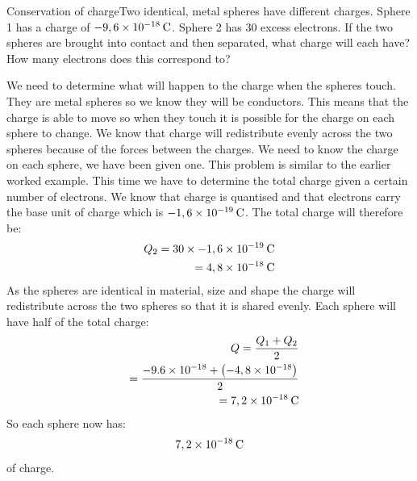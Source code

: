       \begin{wex}{Conservation of charge}{Two identical, metal spheres have different charges. Sphere 1 has a charge of $-9,6\ensuremath{\times}{10}^{-18}\phantom{\rule{2pt}{0ex}}\text{C}$. Sphere 2 has 30 excess electrons. If the two spheres are brought into contact and then separated, what charge will each have? How many electrons does this correspond to?}{
     We need to determine what will happen to the charge when the spheres touch. They are metal spheres so we know they will be conductors. This means that the charge is able to move so when they touch it is possible for the charge on each sphere to change. We know that charge will redistribute evenly across the two spheres because of the forces between the charges. We need to know the charge on each sphere, we have been given one.
     This problem is similar to the earlier worked example. This time we have to determine the total charge given a certain number of electrons. We know that charge is quantised and that electrons carry the base unit of charge which is $-1,6\ensuremath{\times}{10}^{-19}\phantom{\rule{2pt}{0ex}}\text{C}$. The total charge will therefore be:
    \begin{eqnarray*}
    {Q}_{2}=30\ensuremath{\times}-1,6\ensuremath{\times}{10}^{-19}\phantom{\rule{2pt}{0ex}}\text{C}\\ \phantom{x}=4,8\ensuremath{\times}{10}^{-18}\phantom{\rule{2pt}{0ex}}\text{C}
      \end{eqnarray*}
     As the spheres are identical in material, size and shape the charge will redistribute across the two spheres so that it is shared evenly. Each sphere will have half of the total charge:
    \begin{eqnarray*}
Q=\frac{{Q}_{1}+{Q}_{2}}{2}\\ \phantom{x}=\frac{-9.6\ensuremath{\times}{10}^{-18}+\left(-4,8\ensuremath{\times}{10}^{-18}\right)}{2}\\ \phantom{x}=7,2\ensuremath{\times}{10}^{-18}\phantom{\rule{2pt}{0ex}}\text{C}
    \end{eqnarray*}
 So each sphere now has: 
\label{m38781*id61212}\nopagebreak\noindent{}
    \begin{equation*}
    7,2\ensuremath{\times}{10}^{-18}\phantom{\rule{2pt}{0ex}}\text{C}
      \end{equation*}
     of charge.\item \newline
}
\end{wex}
